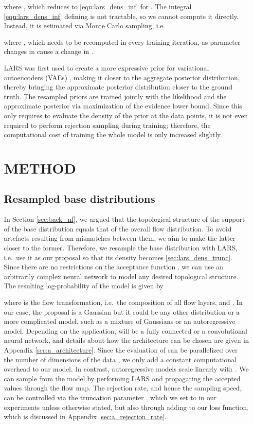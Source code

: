 \documentclass[twoside]{article}
\begin{document}
where , which reduces to \eqref{equ:lars_dens_inf} for . The integral \eqref{equ:lars_dens_inf} defining  is not tractable, so we cannot compute it directly. Instead, it is estimated via Monte Carlo sampling, i.e.

where , which needs to be recomputed in every training iteration, as parameter changes in  cause a change in .

LARS was first used to create a more expressive prior for variational autoencoders (VAEs) \citep{Kingma2014}, making it closer to the aggregate posterior distribution, thereby bringing the approximate posterior distribution closer to the ground truth. The resampled priors are trained jointly with the likelihood and the approximate posterior via maximization of the evidence lower bound. Since this only requires to evaluate the density of the prior at the data points, it is not even required to perform rejection sampling during training; therefore, the computational cost of training the whole model is only increased slightly.



\section{METHOD}
\subsection{Resampled base distributions}
\label{sec:method_basic_idea}

In Section \ref{sec:back_nf}, we argued that the topological structure of the support of the base distribution equals that of the overall flow distribution. To avoid artefacts resulting from mismatches between them, we aim to make the latter closer to the former. Therefore, we resample the base distribution with LARS, i.e.\ use it as our proposal so that its density becomes \eqref{sec:lars_dens_trunc}. Since there are no restrictions on the acceptance function , we can use an arbitrarily complex neural network to model any desired topological structure. The resulting log-probability of the model is given by

where  is the flow transformation, i.e.\ the composition of all flow layers, and . In our case, the proposal is a Gaussian but it could be any other distribution or a more complicated model, such as a mixture of Gaussians or an autoregressive model. Depending on the application,  will be a fully connected or a convolutional neural network, and details about how the architecture can be chosen are given in Appendix \ref{sec:a_architecture}. Since the evaluation of  can be parallelized over the number of dimensions of the data , we only add a constant computational overhead to our model. In contrast, autoregressive models scale linearly with . We can sample from the model by performing LARS and propagating the accepted values through the flow map. The rejection rate, and hence the sampling speed, can be controlled via the truncation parameter , which we set to  in our experiments unless otherwise stated, but also through adding  to our loss function, which is discussed in Appendix \ref{sec:a_rejection_rate}.
\end{document}
